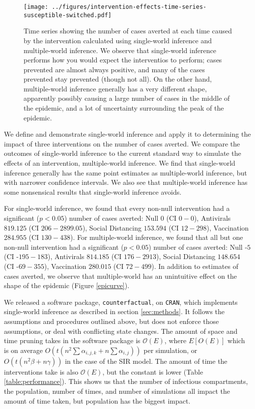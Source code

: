 \documentclass[PTRSB]{rsos}
\begin{document}
\begin{figure}\label{fig:epicurve}
\centering
\texttt{[image: ../figures/intervention-effects-time-series-susceptible-switched.pdf]}
\caption{Time series showing the number of cases averted at each time caused by the intervention calculated using single-world inference and multiple-world inference.  We observe that single-world inference performs how you would expect the interventios to perform; cases prevented are almost always positive, and many of the cases prevented stay prevented (though not all). On the other hand, multiple-world inference generally has a very different shape, apparently possibly causing a large number of cases in the middle of the epidemic, and a lot of uncertainty surrounding the peak of the epidemic.}
\end{figure}

We define and demonstrate single-world inference and apply it to determining the impact of three interventions on the number of cases averted.
We compare the outcomes of single-world inference to the current standard way to simulate the effects of an intervention, multiple-world inference.
We find that single-world inference generally has the same point estimates as multiple-world inference, but with narrower confidence intervals.
We also see that multiple-world inference has some nonsensical results that single-world inference avoids.

For single-world inference, we found that every non-null intervention had a significant ($p<0.05$) number of cases averted: Null $0$ (CI $0-0$), Antivirals $819.125$ (CI $206 - 2899.05$), Social Distancing $153.594 $ (CI $12 - 298$), Vaccination $ 284.955 $ (CI $130 - 438$).
For multiple-world inference, we found that all but one non-null intervention had a significant ($p<0.05$) number of cases averted: Null  -$5 $ (CI  -$195 - 183$), Antivirals $814.185$ (CI $176 - 2913 $), Social Distancing $148.654$ (CI -$69 - 355$), Vaccination $280.015$ (CI $72 - 499$).
In addition to estimates of cases averted, we observe that multiple-world has an unintuitive effect on the shape of the epidemic (Figure \ref{epicurve}).

We released a software package, \texttt{counterfactual}, on \texttt{CRAN}, %
which implements single-world inference as described in section \ref{sec:methods}.
It follows the assumptions and procedures outlined above, but does not enforce those assumptions, or deal with conflicting state changes.
The amount of space and time pruning takes in the software package is $\mathcal O(E)$, where $E[O(E)]$ which is on average $O(t(n^2\sum \alpha_{i,j,k} + n \sum\alpha_{i,j}))$ per simulation, or $O(t(n^2\beta + n\gamma))$ in the case of the SIR model.
The amount of time the interventions take is also $\mathcal O(E)$, but the constant is lower (Table \ref{table:performance}).
This shows us that the number of infectious compartments, the population, number of times, and number of simulations all impact the amount of time taken, but population has the biggest impact.
\end{document}

